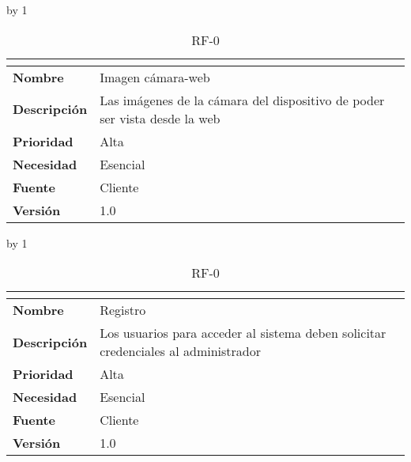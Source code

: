 \advance\rf by 1
\begin{table}[H]
	\caption{RF-0\number\rf}
	\begin{tabular}{|l|p{}|}
		\hline
		\multicolumn{2}{|c|}{\cellcolor[HTML]{BFBFBF}{\color[HTML]{000000} \textbf{RF-0\number\rf}}} \\ \hline
		\textbf{Nombre}      & Imagen cámara-web                                                         \\ \hline
		\textbf{Descripción} & Las imágenes de la cámara del dispositivo de poder ser vista desde la web \\ \hline
		\textbf{Prioridad}   & Alta                                                                      \\ \hline
		\textbf{Necesidad}   & Esencial                                                                  \\ \hline
		\textbf{Fuente}      & Cliente                                                                   \\ \hline
		\textbf{Versión}     & 1.0                                                                       \\ \hline
	\end{tabular}
\end{table}
\advance\rf by 1
\begin{table}[H]
	\caption{RF-0\number\rf}
	\begin{tabular}{|l|p{}|}
		\hline
		\multicolumn{2}{|c|}{\cellcolor[HTML]{BFBFBF}{\color[HTML]{000000} \textbf{RF-0\number\rf}}} \\ \hline
		\textbf{Nombre}      & Registro                                                                           \\ \hline
		\textbf{Descripción} & Los usuarios para acceder al sistema deben solicitar credenciales al administrador \\ \hline
		\textbf{Prioridad}   & Alta                                                                               \\ \hline
		\textbf{Necesidad}   & Esencial                                                                           \\ \hline
		\textbf{Fuente}      & Cliente                                                                            \\ \hline
		\textbf{Versión}     & 1.0                                                                                \\ \hline
	\end{tabular}
\end{table}
